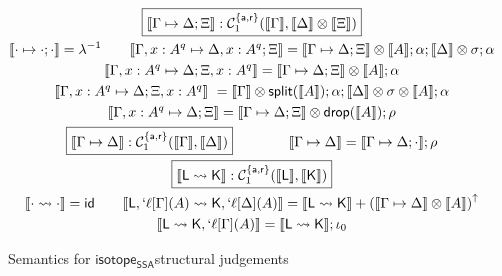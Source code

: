 \documentclass[acmsmall,screen,review]{acmart}
\newcommand{\mc}[1]{\ensuremath{\mathcal{#1}}}
\newcommand{\mb}[1]{\ensuremath{\mathbf{#1}}}
\newcommand{\ms}[1]{\ensuremath{\mathsf{#1}}}
\newcommand{\lbl}[1]{{`#1}}
\newcommand{\csplits}[3]{#1 \mapsto #2;#3}
\newcommand{\cwk}[2]{#1 \mapsto #2}
\newcommand{\lwk}[2]{#1 \rightsquigarrow #2}
\newcommand{\tlin}[2]{#2 \subseteq \ms{lin}(#1)}
\newcommand{\thyp}[3]{#1: {#2}^{#3}}
\newcommand{\lhyp}[3]{#1[#2](#3)}
\newcommand{\llhyp}[3]{\lhyp{\lbl{#1}}{#2}{#3}}
\newcommand{\taff}{{\{\ms{a}\}}}
\newcommand{\trel}{{\{\ms{r}\}}}
\newcommand{\tint}{{\{\ms{a}, \ms{r}\}}}
\newcommand{\dnt}[1]{\llbracket{#1}\rrbracket}
\newcommand{\upg}[2]{{#1}^{\uparrow #2}}
\newcommand{\isotopessa}{\ms{isotope_{SSA}}}
\begin{document}
\begin{figure}
  \begin{gather*}
    \boxed{\dnt{\csplits{\Gamma}{\Delta}{\Xi}}
      : \mc{C}_1^\tint(\dnt{\Gamma}, \dnt{\Delta} \otimes \dnt{\Xi})}
      \\
    \dnt{\csplits{\cdot}{\cdot}{\cdot}} = \lambda^{-1} \qquad
    \dnt{\csplits
      {\Gamma, \thyp{x}{A}{q}}
      {\Delta, \thyp{x}{A}{q}}
      {\Xi}} 
      = \dnt{\csplits{\Gamma}{\Delta}{\Xi}} \otimes \dnt{A};\alpha;\dnt{\Delta} \otimes \sigma;\alpha 
      \\
    \dnt{\csplits
      {\Gamma, \thyp{x}{A}{q}}
      {\Delta}
      {\Xi, \thyp{x}{A}{q}}} 
      = \dnt{\csplits{\Gamma}{\Delta}{\Xi}} \otimes \dnt{A};\alpha 
      \\
    \dnt{\csplits
      {\Gamma, \thyp{x}{A}{q}}
      {\Delta}
      {\Xi, \thyp{x}{A}{q}}} \
      = \dnt{\Gamma} \otimes \ms{split}(\dnt{A});
        \alpha;
        \dnt{\Delta} \otimes \sigma \otimes \dnt{A};
        \alpha 
        \\
    \dnt{\csplits
      {\Gamma, \thyp{x}{A}{q}}
      {\Delta}
      {\Xi}}
      = \dnt{\csplits{\Gamma}{\Delta}{\Xi}}
        \otimes \ms{drop}(\dnt{A})
      ; \rho 
      \\
    \boxed{\dnt{\cwk{\Gamma}{\Delta}}
      : \mc{C}_1^\tint(\dnt{\Gamma}, \dnt{\Delta})} 
      \qquad \qquad
      \dnt{\cwk{\Gamma}{\Delta}} 
      = \dnt{\csplits{\Gamma}{\Delta}{\cdot}};\rho 
      \\
    \boxed{\dnt{\lwk{\ms{L}}{\ms{K}}}
      : \mc{C}_1^\tint(\dnt{\ms{L}}, \dnt{\ms{K}})} 
      \\
    \dnt{\lwk{\cdot}{\cdot}} = \ms{id} \qquad
    \dnt{\lwk
      {\ms{L}, \llhyp{\ell}{\Gamma}{A}}
      {\ms{K}, \llhyp{\ell}{\Delta}{A}}}
      = \dnt{\lwk{\ms{L}}{\ms{K}}} + \upg{(\dnt{\cwk{\Gamma}{\Delta}} \otimes \dnt{A})}{} 
      \\
    \dnt{\lwk{\ms{L}}{\ms{K}, \llhyp{\ell}{\Gamma}{A}}}
      = \dnt{\lwk{\ms{L}}{\ms{K}}};\iota_0
  \end{gather*}
  \caption{Semantics for \isotopessa structural judgements}
  \label{fig:ssa-structural-semantics}
\end{figure}
\end{document}
